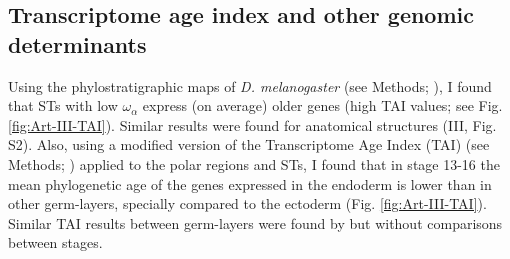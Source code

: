 \subsection{Transcriptome age index and other genomic determinants}
Using the phylostratigraphic maps of \textit{D. melanogaster} (see Methods; \citealp{Drost2015}), I found that STs with low $\omega_{\alpha}$ express (on average) older genes (high TAI values; see Fig. \ref{fig:Art-III-TAI}). Similar results were found for anatomical structures (III, Fig. S2).
%
%
Also, using a modified version of the Transcriptome Age Index (TAI) (see Methods; \citealp{Domazet-Loso2010}) applied to the polar regions and STs, I found that in stage 13-16 the mean phylogenetic age of the genes expressed in the endoderm is lower than in other germ-layers, specially compared to the ectoderm (Fig. \ref{fig:Art-III-TAI}).
Similar TAI results between germ-layers were found by \citet{Domazet-Loso2007} but without comparisons between stages.

